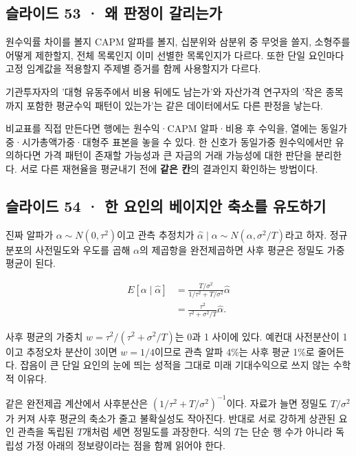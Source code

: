 \documentclass[11pt,a4paper]{article}
\begin{document}
\subsection{슬라이드 53 · 왜 판정이 갈리는가}
원수익률 차이를 볼지 CAPM 알파를 볼지, 십분위와 삼분위 중 무엇을 쓸지, 소형주를 어떻게 제한할지, 전체 목록인지 이미 선별한 목록인지가 다르다. 또한 단일 요인마다 고정 임계값을 적용할지 주제별 증거를 함께 사용할지가 다르다.\par

기관투자자의 '대형 유동주에서 비용 뒤에도 남는가'와 자산가격 연구자의 '작은 종목까지 포함한 평균수익 패턴이 있는가'는 같은 데이터에서도 다른 판정을 낳는다.\par

비교표를 직접 만든다면 행에는 원수익·CAPM 알파·비용 후 수익을, 열에는 동일가중·시가총액가중·대형주 표본을 놓을 수 있다. 한 신호가 동일가중 원수익에서만 유의하다면 가격 패턴이 존재할 가능성과 큰 자금의 거래 가능성에 대한 판단을 분리한다. 서로 다른 재현율을 평균내기 전에 \textbf{같은 칸}의 결과인지 확인하는 방법이다.\par

\subsection{슬라이드 54 · 한 요인의 베이지안 축소를 유도하기}
진짜 알파가 $\alpha\sim N(0,\tau^2)$이고 관측 추정치가 $\hat\alpha\mid\alpha\sim N(\alpha,\sigma^2/T)$라고 하자. 정규분포의 사전밀도와 우도를 곱해 $\alpha$의 제곱항을 완전제곱하면 사후 평균은 정밀도 가중평균이 된다.\par

\[
\begin{aligned}
E[\alpha\mid\hat\alpha]
&=\frac{T/\sigma^2}{1/\tau^2+T/\sigma^2}\hat\alpha\\
&=\frac{\tau^2}{\tau^2+\sigma^2/T}\hat\alpha.
\end{aligned}
\]

사후 평균의 가중치 $w=\tau^2/(\tau^2+\sigma^2/T)$는 0과 1 사이에 있다. 예컨대 사전분산이 1이고 추정오차 분산이 3이면 $w=1/4$이므로 관측 알파 4\%는 사후 평균 1\%로 줄어든다. 잡음이 큰 단일 요인의 눈에 띄는 성적을 그대로 미래 기대수익으로 쓰지 않는 수학적 이유다.\par

같은 완전제곱 계산에서 사후분산은 $(1/\tau^2+T/\sigma^2)^{-1}$이다. 자료가 늘면 정밀도 $T/\sigma^2$가 커져 사후 평균의 축소가 줄고 불확실성도 작아진다. 반대로 서로 강하게 상관된 요인 관측을 독립된 $T$개처럼 세면 정밀도를 과장한다. 식의 $T$는 단순 행 수가 아니라 독립성 가정 아래의 정보량이라는 점을 함께 읽어야 한다.\par
\end{document}
